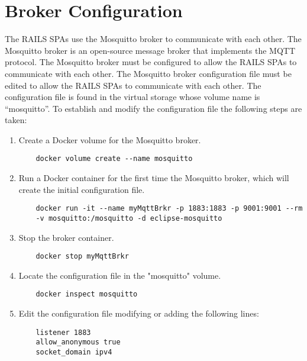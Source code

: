 \section{Broker Configuration}
\label{sec:brokerconfig}
The \ac{RAILS} \acp{SPA} use the Mosquitto broker to communicate with each other. The Mosquitto broker is an open-source message broker that implements the \ac{MQTT} protocol. The Mosquitto broker must be configured to allow the \ac{RAILS} \acp{SPA} to communicate with each other. The Mosquitto broker configuration file must be edited to allow the \ac{RAILS} \acp{SPA} to communicate with each other. The configuration file is found in the virtual storage whose volume name is “mosquitto”. To establish and modify the configuration file the following steps are taken:
\begin{enumerate}
    \item Create a Docker volume for the Mosquitto broker.
    \begin{verbatim}
    docker volume create --name mosquitto
    \end{verbatim}
    \item Run a Docker container for the first time the Mosquitto broker, which will create the initial configuration file.
    \begin{verbatim}
    docker run -it --name myMqttBrkr -p 1883:1883 -p 9001:9001 --rm
    -v mosquitto:/mosquitto -d eclipse-mosquitto
    \end{verbatim}
    \item Stop the broker container.
    \begin{verbatim}    
    docker stop myMqttBrkr
    \end{verbatim}
    \item Locate the configuration file in the "mosquitto" volume.
    \begin{verbatim}    
    docker inspect mosquitto
    \end{verbatim}
    \item Edit the configuration file modifying or adding the following lines:
    \begin{verbatim}
    listener 1883
    allow_anonymous true
    socket_domain ipv4
    \end{verbatim}
\end{enumerate}
